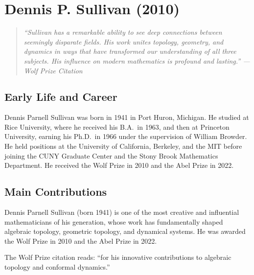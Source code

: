 \providecommand{\Map}{\operatorname{Map}}
\providecommand{\Sing}{\operatorname{Sing}}
\providecommand{\Diff}{\operatorname{Diff}}
\providecommand{\Homeo}{\operatorname{Homeo}}
\providecommand{\Top}{\operatorname{Top}}
\providecommand{\PL}{\operatorname{PL}}
\providecommand{\cat}{\operatorname{cat}}
\providecommand{\Ho}{\operatorname{Ho}}

\chapter{Dennis P. Sullivan (2010)}

\begin{quote}
\it ``Sullivan has a remarkable ability to see deep connections between seemingly disparate fields. His work unites topology, geometry, and dynamics in ways that have transformed our understanding of all three subjects. His influence on modern mathematics is profound and lasting.'' --- Wolf Prize Citation
\end{quote}

\section{Early Life and Career}

Dennis Parnell Sullivan was born in 1941 in Port Huron, Michigan. He studied at Rice University, where he received his B.A.\ in 1963, and then at Princeton University, earning his Ph.D.\ in 1966 under the supervision of William Browder. He held positions at the University of California, Berkeley, and the MIT before joining the CUNY Graduate Center and the Stony Brook Mathematics Department. He received the Wolf Prize in 2010 and the Abel Prize in 2022.

\section{Main Contributions}

Dennis Parnell Sullivan (born 1941) is one of the most creative and influential mathematicians of his generation, whose work has fundamentally shaped algebraic topology, geometric topology, and dynamical systems. He was awarded the Wolf Prize in 2010 and the Abel Prize in 2022.

The Wolf Prize citation reads: ``for his innovative contributions to algebraic topology and conformal dynamics.''

